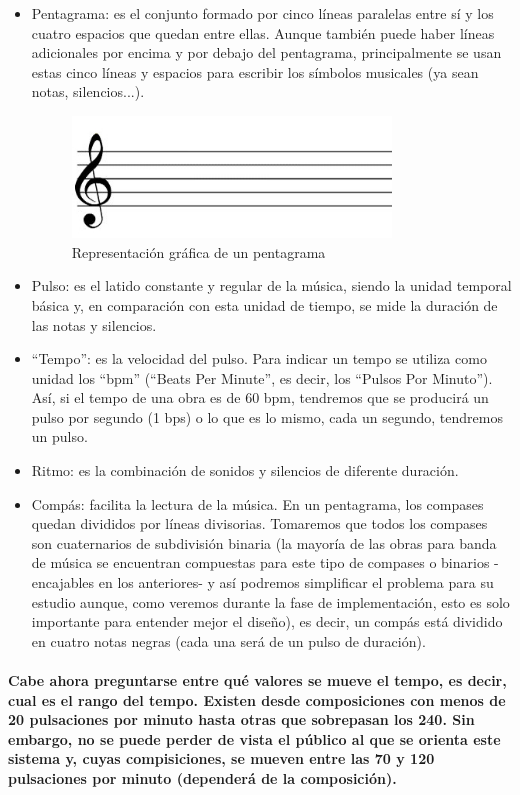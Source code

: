 \begin{itemize}
\item Pentagrama: es el conjunto formado por cinco líneas paralelas entre sí y los cuatro espacios que quedan entre ellas. Aunque también puede haber líneas adicionales por encima y por debajo del pentagrama, principalmente se usan estas cinco líneas y espacios para escribir los símbolos musicales (ya sean notas, silencios...).
  \begin{figure}[htb]
  \centering
  \includegraphics[width=0.8\textwidth]{./imagenes/pentagrama}
  \caption{Representación gráfica de un pentagrama} \label{fig:pentagrama}
  \end{figure}
\item Pulso: es el latido constante y regular de la música, siendo la unidad temporal básica y, en comparación con esta unidad de tiempo, se mide la duración de las notas y silencios.
\item “Tempo”: es la velocidad del pulso. Para indicar un tempo se utiliza como unidad los “bpm” (“Beats Per Minute”, es decir, los “Pulsos Por Minuto”). Así, si el tempo de una obra es de 60 bpm, tendremos que se producirá un pulso por segundo (1 bps) o lo que es lo mismo, cada un segundo, tendremos un pulso.
\item Ritmo: es la combinación de sonidos y silencios de diferente duración.
\item Compás: facilita la lectura de la música. En un pentagrama, los compases quedan divididos por líneas divisorias. Tomaremos que todos los compases son cuaternarios de subdivisión binaria (la mayoría de las obras para banda de música se encuentran compuestas para este tipo de compases o binarios -encajables en los anteriores- y así podremos simplificar el problema para su estudio aunque, como veremos durante la fase de implementación, esto es solo importante para entender mejor el diseño), es decir, un compás está dividido en cuatro notas negras (cada una será de un pulso de duración).
\end{itemize}

\paragraph{
Cabe ahora preguntarse entre qué valores se mueve el tempo, es decir, cual es el rango
del tempo. Existen desde composiciones con menos de 20 pulsaciones por minuto hasta
otras que sobrepasan los 240. Sin embargo, no se puede perder de vista
el público al que se orienta este sistema y, cuyas compisiciones, se mueven entre las 70 y 120 pulsaciones
por minuto (dependerá de la composición).
}

